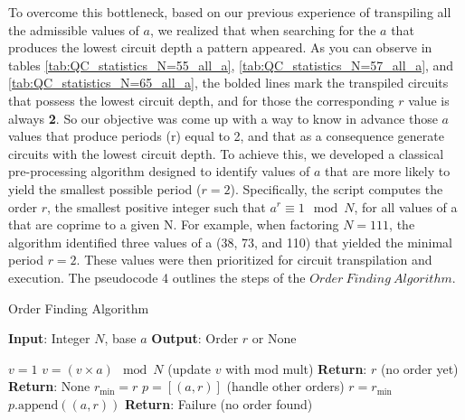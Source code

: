 \documentclass[conference,twoside]{IEEEtran}
\begin{document}
To overcome this bottleneck, based on our previous experience of transpiling all the admissible values of $a$, we realized that when searching for the $a$ that produces the lowest circuit depth a pattern appeared. As you can observe in tables \ref{tab:QC_statistics_N=55_all_a}, \ref{tab:QC_statistics_N=57_all_a}, and \ref{tab:QC_statistics_N=65_all_a}, the bolded lines mark the transpiled circuits that possess the lowest circuit depth, and for those the corresponding $r$ value is always \textbf{2}. So our objective was come up with a way to know in advance those $a$ values that produce periods (r) equal to 2, and that as a consequence generate circuits with the lowest circuit depth. To achieve this, we developed a classical pre-processing algorithm designed to identify values of $a$ that are more likely to yield the smallest possible period ($r = 2$). Specifically, the script computes the order $r$, the smallest positive integer such that \( a^r \equiv 1 \mod N \), for all values of a that are coprime to a given N. For example, when factoring $N = 111$, the algorithm identified three values of a (38, 73, and 110) that yielded the minimal period $r = 2.$ These values were then prioritized for circuit transpilation and execution. 
The pseudocode 4 outlines the steps of the $Order \ Finding  \ Algorithm$.

\begin{algorithm}
\caption{Order Finding Algorithm}
\begin{algorithmic}[]
\State \textbf{Input}: Integer \( N \), base \( a \)
\State \textbf{Output}: Order \( r \) or None

        \State \( v = 1 \)
            \State \( v = (v \times a) \mod N \) (update \( v \) with mod mult)
                \State \textbf{Return}: \( r \)
            \Else (no order yet)
                \State \textbf{Return}: None
            \EndIf
                    \State \( r_{\text{min}} = r \)
                    \State \( p = [(a, r)] \)
                \Else (handle other orders)
                    \State \( r = r_{\text{min}} \)
                    \State \( p.\text{append}((a, r)) \)
                \EndIf
            \EndIf
        \EndFor
    \EndIf
\EndFor
\State \textbf{Return}: Failure (no order found)
\end{algorithmic}
\end{algorithm}
\end{document}
